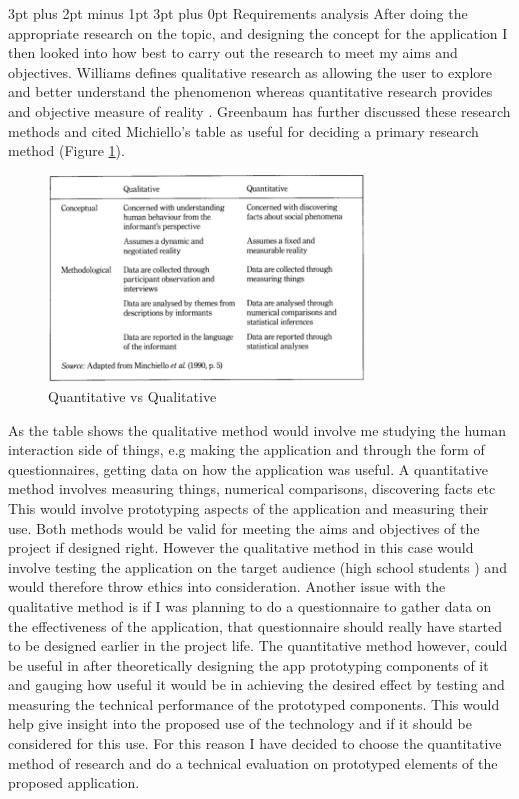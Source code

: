\documentclass[12pt,a4paper]{article}
\makeatletter
\renewcommand\subsection{\@startsection {subsection}{1}{2mm} %
                               {3pt plus 2pt minus 1pt} %
                               {3pt plus 0pt} %
                               {\normalfont\bfseries}}
\makeatother
\begin{document}
\subsection{Requirements analysis} 
After doing the appropriate research on the topic, and designing the concept for the application I then looked into how best to carry out the research to meet my aims and objectives. Williams defines qualitative research as allowing the user to explore and better understand the phenomenon whereas quantitative research provides and objective measure of reality \cite{williams2007research}. Greenbaum has further discussed these research methods \cite{greenbaum1999moderating} and cited Michiello's table as useful for deciding a primary research method (Figure \ref{Research}). 

\begin{figure}[h]
    \centering
    \includegraphics[width=0.75\textwidth]{Figs/research.PNG} 
    \caption{Quantitative vs Qualitative} 
    \label{Research}
\end{figure}  

As the table shows the qualitative method would involve me studying the human interaction side of things, e.g making the application and through the form of questionnaires, getting data on how the application was useful. A quantitative method involves measuring things, numerical comparisons, discovering facts etc This would involve prototyping aspects of the application and measuring their use. Both methods would be valid for meeting the aims and objectives of the project if designed right. However the qualitative method in this case would involve testing the application on the target audience (high school students 
) and would therefore throw ethics into consideration. Another issue with the qualitative method is if I was planning to do a questionnaire to gather data on the effectiveness of the application, that questionnaire should really have  started to be designed earlier in the project life. The quantitative method however, could be useful in after theoretically designing the app prototyping components of it and gauging how useful it would be in achieving the desired effect by testing and measuring the technical performance of the prototyped components. This would help give insight into the proposed use of the technology and if it should be considered for this use. For this reason I have decided to choose the quantitative method of research and do a technical evaluation on prototyped elements of the proposed application.
\end{document}
